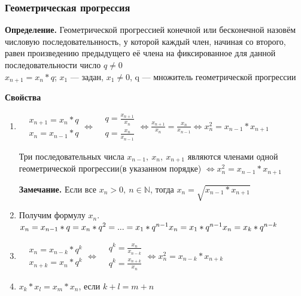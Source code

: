 \documentclass{article}
\begin{document}
    \subsubsection{Геометрическая прогрессия}
    
    \textbf{Определение.} Геометрической прогрессией конечной или бесконечной назовём числовую последовательнность, у которой каждый член, начиная со второго, равен произведению предыдущего её члена на фиксированное для данной последовательности число \(q \not = 0\)
    \\ \(x_{n+1} = x_n * q\); \(x_1\) --- задан, \(x_1 \not = 0\), q --- множитель геометрической прогрессии
    
    \textbf{Свойства}
    
    \begin{enumerate}
    	\item \(\begin{aligned}
				&x_{n+1} = x_n * q\\
				&x_n = x_{n-1} * q
			\end{aligned} \Leftrightarrow
            \begin{aligned}
				&q = \frac{x_{n+1}}{x_n}\\
				&q = \frac{x_{n}}{x_{n-1}}
			\end{aligned} \Leftrightarrow \frac{x_{n+1}}{x_n} = \frac{x_n}{x_{n-1}} \Leftrightarrow x_n^2 = x_{n-1} * x_{n+1}\)
            
            Три последовательных числа \(x_{n-1},\ x_n,\ x_{n+1}\) являются членами одной геометрической прогрессии(в указанном порядке) \(\Leftrightarrow x_n^2 = x_{n-1}*x_{n+1}\)
            
            \textbf{Замечание.} Если все \(x_n > 0,\ n \in \mathbb{N}\), тогда \(x_n = \sqrt{x_{n-1}*x_{n+1}}\)
        \item Получим формулу \(x_n\).
        \\ \(x_n = x_{n-1}*q = x_n * q^2 = ... = x_1 * q^{n-1}\\ x_n = x_1 * q^{n-1}\\ x_n = x_k * q^{n-k}\)
        \item \(\begin{aligned}
				&x_n = x_{n-k}*q^k\\
				&x_{n+k} = x_n*q^k
			\end{aligned} \Leftrightarrow
            \begin{aligned}
				&q^k = \frac{x_n}{x_{n-k}}\\
				&q^k = \frac{x_{n+k}}{x_n}
			\end{aligned} \Leftrightarrow x_n^2 = x_{n-k}*x_{n+k}\)
        \item \(x_k * x_l = x_m * x_n\), если \(k+l=m+n\)
        

\end{enumerate}
\end{document}
